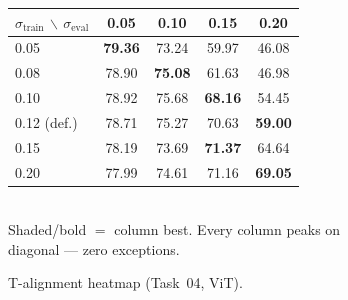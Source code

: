 % 

\begin{figure}[t]
\centering
\begin{subfigure}[b]{0.50\textwidth}
\centering
\small
\setlength{\tabcolsep}{5pt}
\renewcommand{\arraystretch}{1.18}
\begin{tabular}{lcccc}
\toprule
$\sigma_\mathrm{train}$ $\backslash$ $\sigma_\mathrm{eval}$
  & 0.05 & 0.10 & 0.15 & 0.20 \\
\midrule
0.05          & \cellcolor{colPMH!55}\textbf{79.36} & 73.24 & 59.97 & 46.08 \\
0.08          & 78.90 & \cellcolor{colPMH!48}\textbf{75.08} & 61.63 & 46.98 \\
0.10          & 78.92 & 75.68 & \cellcolor{colPMH!52}\textbf{68.16} & 54.45 \\
0.12 (def.)   & 78.71 & 75.27 & 70.63 & \cellcolor{colPMH!50}\textbf{59.00} \\
0.15          & 78.19 & 73.69 & \cellcolor{colPMH!50}\textbf{71.37} & 64.64 \\
0.20          & 77.99 & 74.61 & 71.16 & \cellcolor{colPMH!50}\textbf{69.05} \\
\bottomrule
\end{tabular}
\vspace{4pt}\\
{\footnotesize Shaded/bold $=$ column best. Every column peaks on diagonal --- zero exceptions.}
\caption{T-alignment heatmap (Task~04, ViT).}
\end{subfigure}
\hfill
\begin{subfigure}[b]{0.46\textwidth}
\centering
{}
\end{subfigure}
\end{figure}
